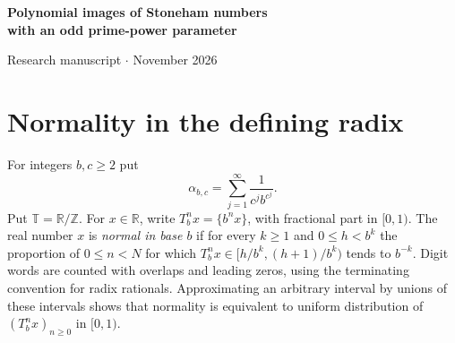 \documentclass[11pt]{article}
\newcommand{\R}{\mathbb R}
\newcommand{\Z}{\mathbb Z}
\newcommand{\T}{\mathbb T}
\begin{document}
\begin{center}
{\LARGE\bfseries Polynomial images of Stoneham numbers\\with an odd prime-power parameter\par}
\vspace{0.6em}
{\small Research manuscript \enspace $\cdot$  November 2026}
\end{center}
\begin{abstract}
Let $b\ge2$ be an integer, $p$ an odd prime with $p\nmid b$, and $c$ a positive power of $p$.
For the standard Stoneham constant $\alpha_{b,c}=\sum_{j\ge1}c^{-j}b^{-c^j}$,
every nonconstant rational polynomial $P(\alpha_{b,c})$ is normal in base $b$.
More generally, a rational combination of products of $\alpha_{b^m,p^e}$ is normal
if it has one monomial of strictly greatest degree with nonzero coefficient.
The proof identifies a nonvanishing inclusion--exclusion numerator for each upper set
of reflected exponents. Compactness bounds the loss in the reduced prefix denominator
uniformly across all insertion patterns.
Distinct positive powers of one generator have jointly uniformly distributed radix orbits.
In particular the classical Stoneham square $\alpha_{2,3}^2$ is binary normal, and we determine its exact prefix denominators.
For multiplicatively independent integers $c,d\ge2$ with $\gcd(b,cd)=1$, the product $\alpha_{b,c}\alpha_{b,d}$ is transcendental and its upper base-$b$ discrepancy is strictly below one. For $b=2$, $c=3$ and $d=5$ the upper bound is $43/45$.
\end{abstract}

\section{Normality in the defining radix}

For integers $b,c\ge2$ put
\begin{equation}\label{eq:stoneham}
 \alpha_{b,c}=\sum_{j=1}^{\infty}\frac{1}{c^j b^{c^j}} .
\end{equation}
Put $\T=\R/\Z$. For $x\in\R$, write $T_b^n x=\{b^nx\}$, with fractional part in $[0,1)$.
The real number $x$ is \emph{normal in base $b$} if for every $k\ge1$ and $0\le h<b^k$
the proportion of $0\le n<N$ for which $T_b^n x\in[h/b^k,(h+1)/b^k)$ tends to $b^{-k}$.
Digit words are counted with overlaps and leading zeros, using the terminating convention for radix rationals.
Approximating an arbitrary interval by unions of these intervals shows that normality
is equivalent to uniform distribution of $(T_b^n x)_{n\ge0}$ in $[0,1)$.
\end{document}
